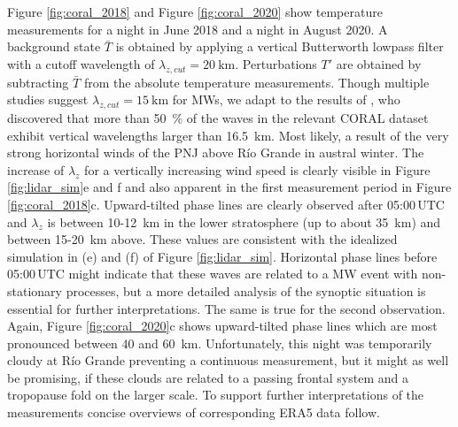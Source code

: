 Figure \ref{fig:coral_2018} and Figure \ref{fig:coral_2020} show temperature measurements for a night in June 2018 and a night in August 2020. A background state $\bar{T}$ is obtained by applying a vertical Butterworth lowpass filter with a cutoff wavelength of $\lambda_{z,cut}=\SI{20}{\kilo\meter}$. Perturbations $T'$ are obtained by subtracting $\bar{T}$ from the absolute temperature measurements. Though multiple studies suggest $\lambda_{z,cut}=\SI{15}{\kilo\meter}$ for MWs, we adapt to the results of \textcite[]{reichert_characterization_2022}, who discovered that more than \SI{50}{\percent} of the waves in the relevant CORAL dataset exhibit vertical wavelengths larger than \SI{16.5}{\kilo\meter}. Most likely, a result of the very strong horizontal winds of the PNJ above Río Grande in austral winter. The increase of $\lambda_z$ for a vertically increasing wind speed is clearly visible in Figure \ref{fig:lidar_sim}e and f and also apparent in the first measurement period in Figure \ref{fig:coral_2018}c. Upward-tilted phase lines are clearly observed after 05:00$ \, \mathrm{UTC}$ and $\lambda_z$ is between 10-\SI{12}{\kilo\meter} in the lower stratosphere (up to about \SI{35}{\kilo\meter}) and between 15-\SI{20}{\kilo\meter} above. These values are consistent with the idealized simulation in (e) and (f) of Figure \ref{fig:lidar_sim}. Horizontal phase lines before 05:00$ \, \mathrm{UTC}$ might indicate that these waves are related to a MW event with non-stationary processes, but a more detailed analysis of the synoptic situation is essential for further interpretations. The same is true for the second observation. Again, Figure \ref{fig:coral_2020}c shows upward-tilted phase lines which are most pronounced between 40 and \SI{60}{\kilo\meter}. Unfortunately, this night was temporarily cloudy at Río Grande preventing a continuous measurement, but it might as well be promising, if these clouds are related to a passing frontal system and a tropopause fold on the larger scale. To support further interpretations of the measurements concise overviews of corresponding ERA5 data follow.
